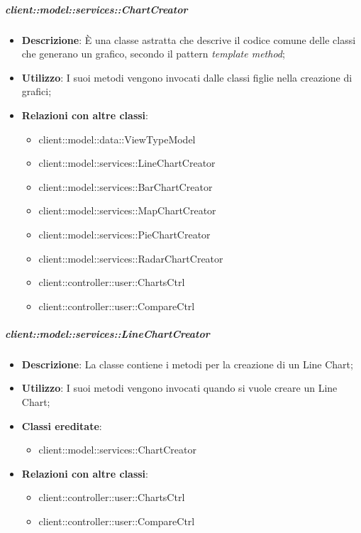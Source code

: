 		\subparagraph{client::model::services::ChartCreator} %
		\label{subp:chartcreator}
			\begin{itemize}
				\item \textbf{Descrizione}: È una classe astratta che descrive il codice comune delle classi che generano un grafico, secondo il pattern \emph{template method};
				\item \textbf{Utilizzo}: I suoi metodi vengono invocati dalle classi figlie nella creazione di grafici;
				\item \textbf{Relazioni con altre classi}:
					\begin{itemize}
						\item client::model::data::ViewTypeModel
						\item client::model::services::LineChartCreator
						\item client::model::services::BarChartCreator
						\item client::model::services::MapChartCreator
						\item client::model::services::PieChartCreator
						\item client::model::services::RadarChartCreator
						\item client::controller::user::ChartsCtrl
						\item client::controller::user::CompareCtrl
					\end{itemize}
			\end{itemize}

		\subparagraph{client::model::services::LineChartCreator} %
		\label{subp:linechartcreator}
			\begin{itemize}
				\item \textbf{Descrizione}: La classe contiene i metodi per la creazione di un Line Chart;
				\item \textbf{Utilizzo}: I suoi metodi vengono invocati quando si vuole creare un Line Chart;
				\item \textbf{Classi ereditate}:					
					\begin{itemize}
						\item client::model::services::ChartCreator
					\end{itemize}
				\item \textbf{Relazioni con altre classi}:					
					\begin{itemize}
						\item client::controller::user::ChartsCtrl
						\item client::controller::user::CompareCtrl
					\end{itemize}
			\end{itemize}


